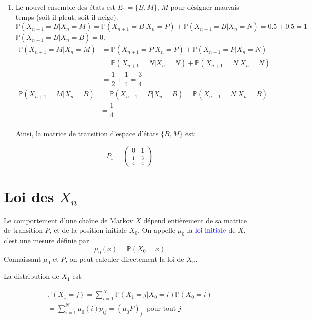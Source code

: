 \documentclass[
]{book}
\providecommand{\tightlist}{%
  \setlength{\itemsep}{0pt}\setlength{\parskip}{0pt}}
\theoremstyle{definition}
\theoremstyle{definition}
\theoremstyle{definition}
\theoremstyle{remark}
\begin{document}
\begin{enumerate}
\def\labelenumi{\arabic{enumi}.}
\setcounter{enumi}{1}
\tightlist
\item
  Le nouvel ensemble des états est \(E_1=\{B, M \}\), \(M\) pour désigner mauvais temps (soit il pleut, soit il neige).
  \[\mathbb{P}(X_{n+1}=B|X_n=M)=\mathbb{P}(X_{n+1}=B|X_n=P)+\mathbb{P}(X_{n+1}=B|X_n=N)=0.5+0.5=1\]
  \(\mathbb{P}(X_{n+1}=B|X_n=B)=0\).
  \begin{align*} 
    \mathbb{P}(X_{n+1}=M|X_n=M)&=\mathbb{P}(X_{n+1}=P|X_n=P)+\mathbb{P}(X_{n+1}=P|X_n=N)\\
    & = \mathbb{P}(X_{n+1}=N|X_n=N)+\mathbb{P}(X_{n+1}=N|X_n=N)\\
    &= \dfrac{1}{2}+\dfrac{1}{4}= \dfrac{3}{4}
    \end{align*}
  \begin{align*} 
    \mathbb{P}(X_{n+1}=M|X_n=B)&=\mathbb{P}(X_{n+1}=P|X_n=B)=\mathbb{P}(X_{n+1}=N|X_n=B)\\
    &= \dfrac{1}{4}
    \end{align*}\\
  Ainsi, la matrice de transition d'espace d'états \(\{B,M\}\) est:
\end{enumerate}

\[
P_1=\left( 
\begin{array}{cc}
0 & 1\\
\frac{1}{4} & \frac{3}{4}
\end{array}
\right)
\]

\hypertarget{loi-des-x_n}{%
\section{\texorpdfstring{Loi des \(X_n\)}{Loi des X\_n}}\label{loi-des-x_n}}

Le comportement d'une chaîne de Markov \(X\) dépend entièrement de sa matrice de transition \(P\), et de la position initiale \(X_0\). On appelle \(\mu_0\) la \(\color{blue}{\mathbf{\text{loi initiale}}}\) de \(X\), c'est une mesure définie par
\[
\mu_0(x)=\mathbb{P}(X_0=x)
\]
Connaissant \(\mu_0\) et \(P\), on peut calculer directement la loi de \(X_n\).

La distribution de \(X_1\) est:

\begin{align*} 
\mathbb{P}(X_1 = j) = \sum_{i=1}^N \mathbb{P}(X_1 = j | X_0 = i)\mathbb{P}(X_0 = i) \\
=
\sum_{i=1}^N \mu_0(i) p_{ij}=(\mu_0 P)_j\; \text{ pour tout }j
\end{align*}
\end{document}
